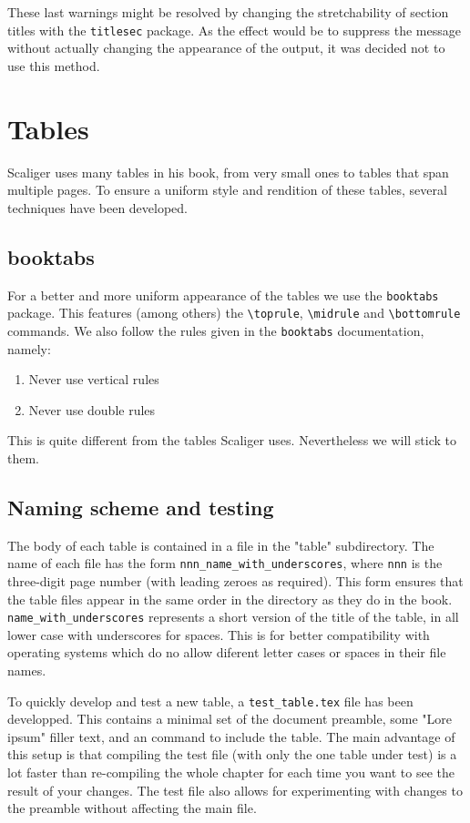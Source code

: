 \documentclass{report}
\begin{document}
These last warnings might be resolved by
changing the stretchability of section titles with the \verb+titlesec+
package.
As the effect would be to suppress the message without actually
changing the appearance
of the output, it was decided not to use this method.


\section{Tables}
Scaliger uses many tables in his book, from very small ones to tables that
span multiple pages.
To ensure a uniform style and rendition of these tables, several techniques
have been developed.

\subsection{booktabs}
For a better and more uniform appearance of the tables we use the
\verb+booktabs+ package. This features (among others) the
\verb+\toprule+, \verb+\midrule+ and \verb+\bottomrule+ commands.
We also follow the rules given in the \verb+booktabs+ documentation, namely:
\begin{enumerate}
\item Never use vertical rules
\item Never use double rules
\end{enumerate}
This is quite different from the tables Scaliger uses.
Nevertheless we will stick to them.

\subsection{Naming scheme and testing}
The body of each table is contained in a file in the "table" subdirectory.
The name of each file has the form \verb+nnn_name_with_underscores+, where
\verb+nnn+ is the three-digit page number (with leading zeroes as required).
This form ensures that the table files appear in the same order in the
directory as they do in the book.
\verb+name_with_underscores+ represents a short version of
the title of the table, in all lower case
with underscores for spaces.
This is for better compatibility with operating
systems which do no allow diferent letter cases or spaces in their file names.

To quickly develop and test a new table, a \verb+test_table.tex+ file has
been developped.
This contains a minimal set of the document preamble, some "Lore ipsum"
filler text, and an \verb++ command to include the table.
The main advantage of this setup is that compiling the test file (with only
the one table under test) is a lot faster than re-compiling the whole
chapter for each time you want to see the result of your changes.
The test file also allows for experimenting with changes to the preamble
without affecting the main file.
\end{document}
